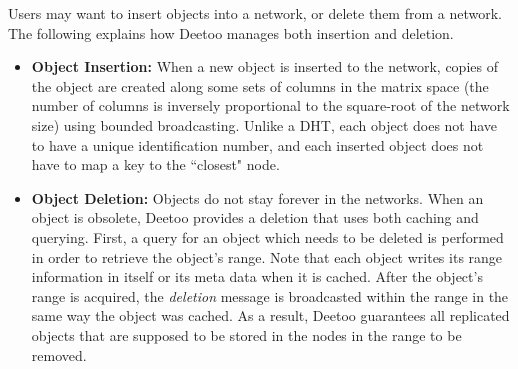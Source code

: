 Users may want to insert objects into a network, or delete them from a network.
The following explains how Deetoo manages both insertion and deletion.
\begin{itemize}
\item \textbf{Object Insertion: } When a new object is inserted to the network,
copies of the object are created along some sets of columns in the matrix
space (the number of columns is inversely proportional to the square-root
of the network size) using bounded broadcasting. Unlike a DHT, each object does not have to have a
unique identification number, and each inserted object does not have
to map a key to the ``closest" node.

\item \textbf{Object Deletion: }Objects do not stay forever in the networks.
When an object is obsolete, Deetoo provides a deletion that uses both 
caching and querying.
First, a query for an object which needs to be deleted is performed in order 
to retrieve the object's range. Note that each object writes its range information 
in itself or its meta data when it is cached. After the object's range is acquired, 
the \emph{deletion} message is broadcasted within the range in the same way the object
was cached. As a result, Deetoo guarantees all replicated objects that are 
supposed to be stored in the nodes in the range to be removed.
\end{itemize}

